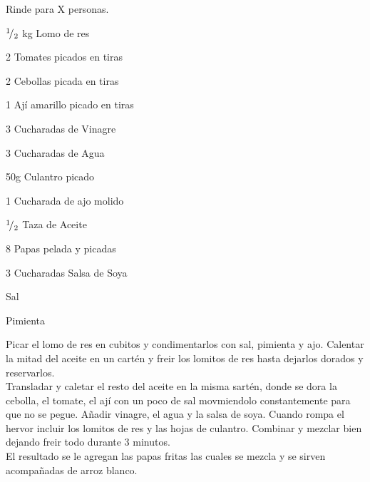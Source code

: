 
Rinde para X personas.\\

\begin{ingredientes}
\item ${}^{1}\!/_{2}$ kg Lomo de res
\item 2 Tomates picados en tiras
\item 2 Cebollas picada en tiras
\item 1 Ají amarillo picado en tiras
\item 3 Cucharadas de Vinagre
\item 3 Cucharadas de Agua
\item 50g Culantro picado
\item 1 Cucharada de ajo molido
\item ${}^{1}\!/_{2}$ Taza de Aceite
\item 8 Papas pelada y picadas
\item 3 Cucharadas Salsa de Soya
\item Sal
\item Pimienta
\end{ingredientes}
\preparacion
Picar el lomo de res en cubitos y condimentarlos con sal, pimienta y ajo. Calentar la mitad del aceite en un cartén y freir los lomitos de res hasta dejarlos dorados y reservarlos.\\

Transladar y caletar el resto del aceite en la misma sartén, donde se dora la cebolla, el tomate, el ají con un poco de sal movmiendolo constantemente para que no se pegue. Añadir vinagre, el agua y la salsa de soya. Cuando rompa el hervor incluir los lomitos de res y las hojas de culantro. Combinar y mezclar bien dejando freir todo durante 3 minutos.\\

El resultado se le agregan las papas fritas las cuales se mezcla y se sirven acompañadas de arroz blanco.